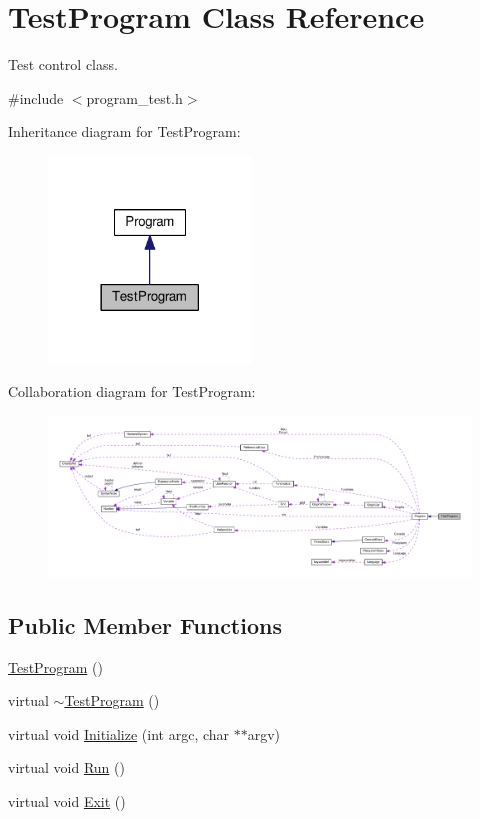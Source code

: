\hypertarget{classTestProgram}{}\section{Test\+Program Class Reference}
\label{classTestProgram}


Test control class.  




{\ttfamily \#include $<$program\+\_\+test.\+h$>$}



Inheritance diagram for Test\+Program\+:\nopagebreak
\begin{figure}[H]
\begin{center}
\leavevmode
\includegraphics[width=153pt]{classTestProgram__inherit__graph}
\end{center}
\end{figure}


Collaboration diagram for Test\+Program\+:\nopagebreak
\begin{figure}[H]
\begin{center}
\leavevmode
\includegraphics[width=350pt]{classTestProgram__coll__graph}
\end{center}
\end{figure}
\subsection*{Public Member Functions}
\begin{DoxyCompactItemize}
\item 
\hyperlink{classTestProgram_afeddf2867d35e37690e8323f22e2149a}{Test\+Program} ()
\item 
virtual \hyperlink{classTestProgram_a66322eca03b7f7e921c2c1509f3101fb}{$\sim$\+Test\+Program} ()
\item 
virtual void \hyperlink{classTestProgram_aaa86d196977b0c510c381100b3c4597d}{Initialize} (int argc, char $\ast$$\ast$argv)
\item 
virtual void \hyperlink{classTestProgram_a4d6e3f03e1297ccfa7d3b32fc358aa8d}{Run} ()
\item 
virtual void \hyperlink{classTestProgram_ae1cfa129414df137fb05dc811e9f6b56}{Exit} ()
\end{DoxyCompactItemize}
